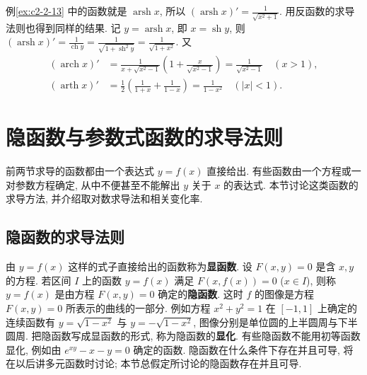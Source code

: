 \documentclass[UTF8,openany]{ctexbook}
\theoremstyle{chinesetextbook}
\begin{document}
例\ref{ex:c2-2-13} 中的函数就是 $\operatorname{arsh}x$, 所以 $\displaystyle(\operatorname{arsh}x)'=\frac1{\sqrt{x^2+1}}$. 用反函数的求导法则也得到同样的结果. 记 $y=\operatorname{arsh}x$, 即 $x=\operatorname{sh}y$, 则 $\displaystyle(\operatorname{arsh}x)'=\frac1{\operatorname{ch}y}=\frac1{\sqrt{1+\operatorname{sh}^2y}}=\frac1{\sqrt{1+x^2}}$. 又
\[
\begin{aligned}
(\operatorname{arch}x)'&=\frac1{x+\sqrt{x^2-1}}\left(1+\frac x{\sqrt{x^2-1}}\right)=\frac1{\sqrt{x^2-1}}\quad(x>1),\\
(\operatorname{arth}x)'&=\frac12\left(\frac1{1+x}+\frac1{1-x}\right)=\frac1{1-x^2}\quad(|x|<1).
\end{aligned}
\]
\section{隐函数与参数式函数的求导法则}
前两节求导的函数都由一个表达式 $y=f(x)$ 直接给出. 有些函数由一个方程或一对参数方程确定, 从中不便甚至不能解出 $y$ 关于 $x$ 的表达式. 本节讨论这类函数的求导方法, 并介绍取对数求导法和相关变化率.
\subsection{隐函数的求导法则}
由 $y=f(x)$ 这样的式子直接给出的函数称为\textbf{显函数}. 设 $F(x,y)=0$ 是含 $x,y$ 的方程. 若区间 $I$ 上的函数 $y=f(x)$ 满足 $F(x,f(x))=0$ ($x\in I$), 则称 $y=f(x)$ 是由方程 $F(x,y)=0$ 确定的\textbf{隐函数}. 这时 $f$ 的图像是方程 $F(x,y)=0$ 所表示的曲线的一部分. 例如方程 $x^2+y^2=1$ 在 $[-1,1]$ 上确定的连续函数有 $y=\sqrt{1-x^2}$ 与 $y=-\sqrt{1-x^2}$, 图像分别是单位圆的上半圆周与下半圆周. 把隐函数写成显函数的形式, 称为隐函数的\textbf{显化}. 有些隐函数不能用初等函数显化, 例如由 $e^{xy}-x-y=0$ 确定的函数. 隐函数在什么条件下存在并且可导, 将在以后讲多元函数时讨论; 本节总假定所讨论的隐函数存在并且可导.
\end{document}
